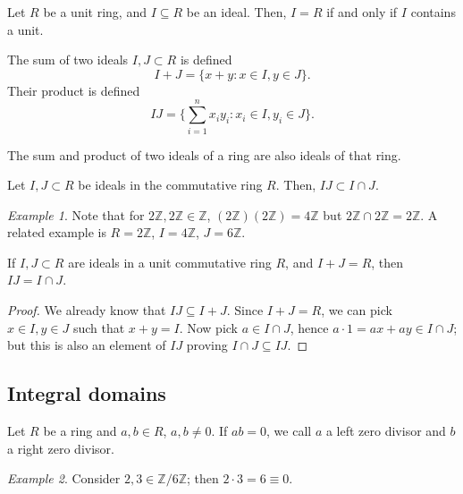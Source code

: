\documentclass[11pt]{article}
\newcommand{\Z}{\mathbb{Z}}
\theoremstyle{definition}
\theoremstyle{remark}
\newtheorem*{example}{Example}
\numberwithin{equation}{section}
\begin{document}
    \begin{lemma}
        Let $R$ be a unit ring, and $I \subseteq R$ be an ideal. Then, $I = R$ if and
        only if $I$ contains a unit.
    \end{lemma}

    \begin{definition}
        The sum of two ideals $I, J \subset R$ is defined \[
            I + J = \{x + y: x \in I, y \in J\}.
        \] Their product is defined \[
            IJ = \{\sum_{i = 1}^n x_iy_i: x_i \in I, y_i \in J\}.
        \]
    \end{definition}

    \begin{lemma}
        The sum and product of two ideals of a ring are also ideals of that ring.
    \end{lemma}

    \begin{lemma}
        Let $I, J \subset R$ be ideals in the commutative ring $R$. Then, $IJ \subset
        I \cap J$.
    \end{lemma}
    \begin{example}
        Note that for $2\Z, 2\Z \in \Z$, $(2\Z)(2\Z) = 4\Z$ but $2\Z \cap 2\Z = 2\Z$.
        A related example is $R = 2\Z$, $I = 4\Z$, $J = 6\Z$.
    \end{example}

    \begin{lemma}
        If $I, J \subset R$ are ideals in a unit commutative ring $R$, and $I + J =
        R$, then $IJ = I \cap J$.
    \end{lemma}
    \begin{proof}
        We already know that $IJ \subseteq I + J$. Since $I + J = R$, we can pick $x
        \in I, y \in J$ such that $x + y = I$. Now pick $a \in I\cap J$, hence
        $a\cdot 1 = ax + ay \in I \cap J$; but this is also an element of $IJ$
        proving $I \cap J \subseteq IJ$.
    \end{proof}
    
    \subsection{Integral domains}
    
    \begin{definition}
        Let $R$ be a ring and $a, b \in R$, $a, b \neq 0$. If $ab = 0$, we call $a$ a
        left zero divisor and $b$ a right zero divisor.
    \end{definition}
    \begin{example}
        Consider $2, 3 \in \Z/6\Z$; then $2\cdot 3 = 6 \equiv 0$.
    \end{example}
\end{document}
